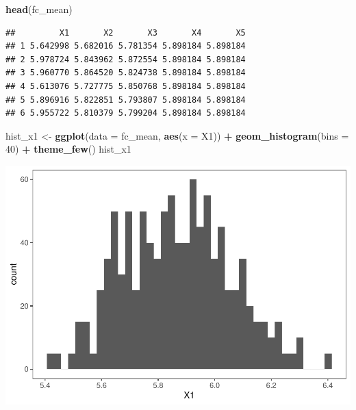 \documentclass[]{article}
\newenvironment{Shaded}{\begin{snugshade}}{\end{snugshade}}
\newcommand{\DataTypeTok}[1]{\textcolor[rgb]{0.13,0.29,0.53}{#1}}
\newcommand{\DecValTok}[1]{\textcolor[rgb]{0.00,0.00,0.81}{#1}}
\newcommand{\KeywordTok}[1]{\textcolor[rgb]{0.13,0.29,0.53}{\textbf{#1}}}
\newcommand{\NormalTok}[1]{#1}
\newcommand{\OperatorTok}[1]{\textcolor[rgb]{0.81,0.36,0.00}{\textbf{#1}}}
\newcommand{\StringTok}[1]{\textcolor[rgb]{0.31,0.60,0.02}{#1}}
\begin{document}
\begin{Shaded}
\begin{Highlighting}[]
\KeywordTok{head}\NormalTok{(fc_mean)}
\end{Highlighting}
\end{Shaded}

\begin{verbatim}
##         X1       X2       X3       X4       X5
## 1 5.642998 5.682016 5.781354 5.898184 5.898184
## 2 5.978724 5.843962 5.872554 5.898184 5.898184
## 3 5.960770 5.864520 5.824738 5.898184 5.898184
## 4 5.613076 5.727775 5.850768 5.898184 5.898184
## 5 5.896916 5.822851 5.793807 5.898184 5.898184
## 6 5.955722 5.810379 5.799204 5.898184 5.898184
\end{verbatim}

\begin{Shaded}
\begin{Highlighting}[]
\NormalTok{hist_x1 <-}\StringTok{ }\KeywordTok{ggplot}\NormalTok{(}\DataTypeTok{data =}\NormalTok{ fc_mean, }\KeywordTok{aes}\NormalTok{(}\DataTypeTok{x =}\NormalTok{ X1)) }\OperatorTok{+}\StringTok{ }\KeywordTok{geom_histogram}\NormalTok{(}\DataTypeTok{bins =} \DecValTok{40}\NormalTok{) }\OperatorTok{+}\StringTok{ }\KeywordTok{theme_few}\NormalTok{() }
\NormalTok{hist_x1}
\end{Highlighting}
\end{Shaded}

\includegraphics{Econo2_P4_files/figure-latex/mean ic-1.pdf}

\begin{Shaded}
\end{Shaded}
\end{document}
